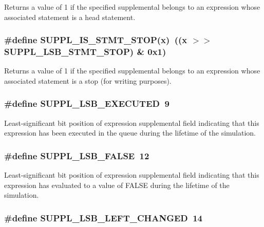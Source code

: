 Returns a value of 1 if the specified supplemental belongs to an expression whose associated statement is a head statement. 
\subsubsection{\setlength{\rightskip}{0pt plus 5cm}\#define SUPPL\_\-IS\_\-STMT\_\-STOP(x)\ ((x $>$$>$ SUPPL\_\-LSB\_\-STMT\_\-STOP) \& 0x1)}\label{group__expr__suppl_a14}


Returns a value of 1 if the specified supplemental belongs to an expression whose associated statement is a stop (for writing purposes). 
\subsubsection{\setlength{\rightskip}{0pt plus 5cm}\#define SUPPL\_\-LSB\_\-EXECUTED\ 9}\label{group__expr__suppl_a2}


Least-significant bit position of expression supplemental field indicating that this expression has been executed in the queue during the lifetime of the simulation. 
\subsubsection{\setlength{\rightskip}{0pt plus 5cm}\#define SUPPL\_\-LSB\_\-FALSE\ 12}\label{group__expr__suppl_a5}


Least-significant bit position of expression supplemental field indicating that this expression has evaluated to a value of FALSE during the lifetime of the simulation. 
\subsubsection{\setlength{\rightskip}{0pt plus 5cm}\#define SUPPL\_\-LSB\_\-LEFT\_\-CHANGED\ 14}\label{group__expr__suppl_a7}


